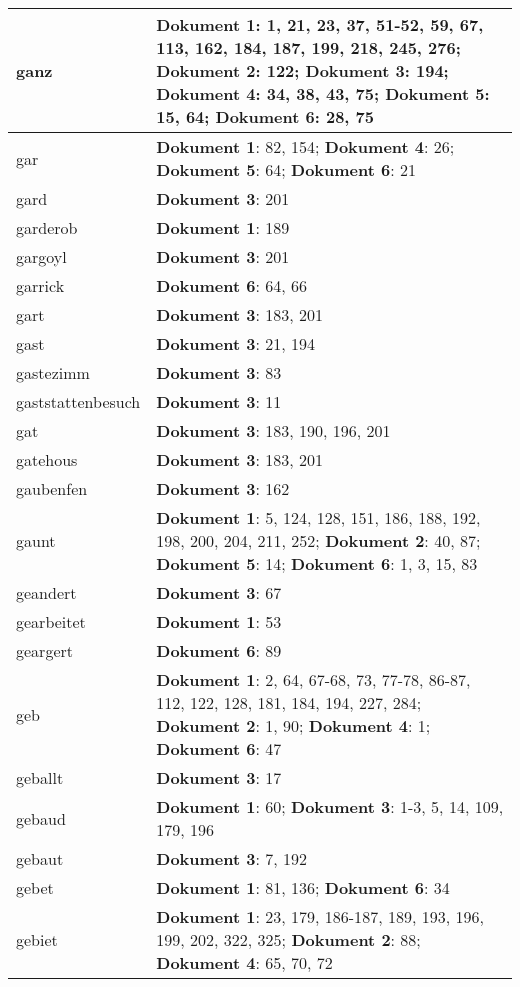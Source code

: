 \documentclass[a5paper]{article}
\begin{document}
\begin{longtable}[l]{|l|p{3in}|}
\hline
ganz & \textbf{Dokument 1}: 1, 21, 23, 37, 51-52, 59, 67, 113, 162, 184, 187, 199, 218, 245, 276; \textbf{Dokument 2}: 122; \textbf{Dokument 3}: 194; \textbf{Dokument 4}: 34, 38, 43, 75; \textbf{Dokument 5}: 15, 64; \textbf{Dokument 6}: 28, 75 \\
\hline
gar & \textbf{Dokument 1}: 82, 154; \textbf{Dokument 4}: 26; \textbf{Dokument 5}: 64; \textbf{Dokument 6}: 21 \\
\hline
gard & \textbf{Dokument 3}: 201 \\
\hline
garderob & \textbf{Dokument 1}: 189 \\
\hline
gargoyl & \textbf{Dokument 3}: 201 \\
\hline
garrick & \textbf{Dokument 6}: 64, 66 \\
\hline
gart & \textbf{Dokument 3}: 183, 201 \\
\hline
gast & \textbf{Dokument 3}: 21, 194 \\
\hline
gastezimm & \textbf{Dokument 3}: 83 \\
\hline
gaststattenbesuch & \textbf{Dokument 3}: 11 \\
\hline
gat & \textbf{Dokument 3}: 183, 190, 196, 201 \\
\hline
gatehous & \textbf{Dokument 3}: 183, 201 \\
\hline
gaubenfen & \textbf{Dokument 3}: 162 \\
\hline
gaunt & \textbf{Dokument 1}: 5, 124, 128, 151, 186, 188, 192, 198, 200, 204, 211, 252; \textbf{Dokument 2}: 40, 87; \textbf{Dokument 5}: 14; \textbf{Dokument 6}: 1, 3, 15, 83 \\
\hline
geandert & \textbf{Dokument 3}: 67 \\
\hline
gearbeitet & \textbf{Dokument 1}: 53 \\
\hline
geargert & \textbf{Dokument 6}: 89 \\
\hline
geb & \textbf{Dokument 1}: 2, 64, 67-68, 73, 77-78, 86-87, 112, 122, 128, 181, 184, 194, 227, 284; \textbf{Dokument 2}: 1, 90; \textbf{Dokument 4}: 1; \textbf{Dokument 6}: 47 \\
\hline
geballt & \textbf{Dokument 3}: 17 \\
\hline
gebaud & \textbf{Dokument 1}: 60; \textbf{Dokument 3}: 1-3, 5, 14, 109, 179, 196 \\
\hline
gebaut & \textbf{Dokument 3}: 7, 192 \\
\hline
gebet & \textbf{Dokument 1}: 81, 136; \textbf{Dokument 6}: 34 \\
\hline
gebiet & \textbf{Dokument 1}: 23, 179, 186-187, 189, 193, 196, 199, 202, 322, 325; \textbf{Dokument 2}: 88; \textbf{Dokument 4}: 65, 70, 72 \\

\end{longtable}
\end{document}
